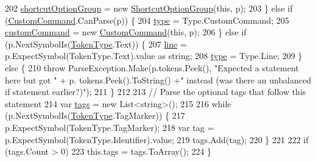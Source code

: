 \begin{DoxyCode}
202                     \hyperlink{a00156_a54d73ad69c4af4a0d61edeaea4c8ca4f}{shortcutOptionGroup} = \textcolor{keyword}{new} 
      \hyperlink{a00156_a518000e4e6219ce5f9f4229f505cd944ae8a0b2e51320b69d57d378776ee0647a}{ShortcutOptionGroup}(\textcolor{keyword}{this}, p);
203                 \} \textcolor{keywordflow}{else} \textcolor{keywordflow}{if} (\hyperlink{a00156_a518000e4e6219ce5f9f4229f505cd944af6b081742758e5cbc3a2e679e521a4fe}{CustomCommand}.CanParse(p)) \{
204                     \hyperlink{a00156_aa3fa0eb260e412720562ce06b7dc06fe}{type} = Type.CustomCommand;
205                     \hyperlink{a00156_a8a98e7d4c66f9909da865f0e671d69f2}{customCommand} = \textcolor{keyword}{new} \hyperlink{a00156_a518000e4e6219ce5f9f4229f505cd944af6b081742758e5cbc3a2e679e521a4fe}{CustomCommand}(\textcolor{keyword}{this}, p);
206                 \} \textcolor{keywordflow}{else} \textcolor{keywordflow}{if} (p.NextSymbolIs(\hyperlink{a00041_a301aa7c866593a5b625a8fc158bbeace}{TokenType}.Text)) \{
207                     \hyperlink{a00156_a37695c7b00776bb292fd64894a70fb72}{line} = p.ExpectSymbol(TokenType.Text).value as \textcolor{keywordtype}{string};
208                     \hyperlink{a00156_aa3fa0eb260e412720562ce06b7dc06fe}{type} = Type.Line;
209                 \} \textcolor{keywordflow}{else} \{
210                     \textcolor{keywordflow}{throw} ParseException.Make(p.tokens.Peek(), \textcolor{stringliteral}{"Expected a statement here but got "} + p.
      tokens.Peek().ToString() +\textcolor{stringliteral}{" instead (was there an unbalanced if statement earlier?)"});
211                 \}
212 
213                 \textcolor{comment}{// Parse the optional tags that follow this statement}
214                 var \hyperlink{a00138_a58b3a15788fd2d4127d73619dc6d04ae}{tags} = \textcolor{keyword}{new} List<string>();
215 
216                 \textcolor{keywordflow}{while} (p.NextSymbolIs(\hyperlink{a00041_a301aa7c866593a5b625a8fc158bbeace}{TokenType}.TagMarker)) \{
217                     p.ExpectSymbol(TokenType.TagMarker);
218                     var tag = p.ExpectSymbol(TokenType.Identifier).value;
219                     tags.Add(tag);
220                 \}
221 
222                 \textcolor{keywordflow}{if} (tags.Count > 0)
223                     this.tags = tags.ToArray();
224             \}
\end{DoxyCode}


